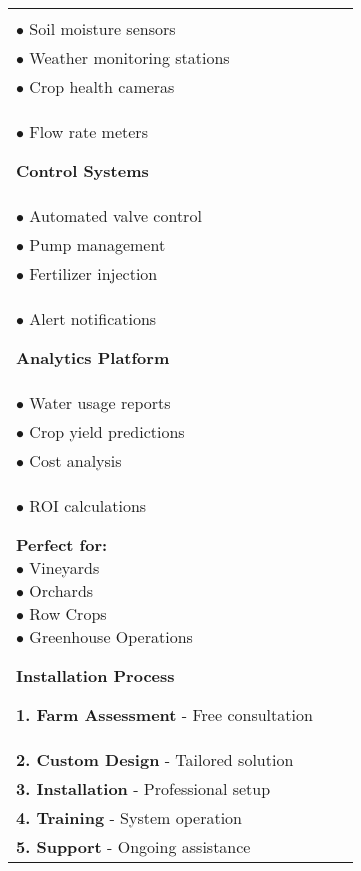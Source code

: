 \documentclass[a4paper,landscape]{article}
\begin{document}
\begin{tabular}{|p{8.5cm}|p{8.5cm}|p{8.5cm}|}
\begin{minipage}[t]{8cm}
{\large \textcolor{wetgreen}{\textbf{Sensor Network}}}\\
\small
$\bullet$ Soil moisture sensors\\
$\bullet$ Weather monitoring stations\\
$\bullet$ Crop health cameras\\
$\bullet$ Flow rate meters

\vspace{0.4cm}

{\large \textcolor{wetgreen}{\textbf{Control Systems}}}\\
\small
$\bullet$ Automated valve control\\
$\bullet$ Pump management\\
$\bullet$ Fertilizer injection\\
$\bullet$ Alert notifications

\vspace{0.4cm}

{\large \textcolor{wetgreen}{\textbf{Analytics Platform}}}\\
\small
$\bullet$ Water usage reports\\
$\bullet$ Crop yield predictions\\
$\bullet$ Cost analysis\\
$\bullet$ ROI calculations

\vspace{0.5cm}

\colorbox{wetlightgreen}{\parbox{7cm}{
\centering
\textcolor{wetblue}{\textbf{Perfect for:}}\\[0.2cm]
\textcolor{wetgreen}{$\bullet$ Vineyards}\\
\textcolor{wetgreen}{$\bullet$ Orchards}\\
\textcolor{wetgreen}{$\bullet$ Row Crops}\\
\textcolor{wetgreen}{$\bullet$ Greenhouse Operations}
}}

\vspace{0.5cm}

{\Large \textcolor{wetblue}{\textbf{Installation Process}}}

\vspace{0.3cm}

\small
\textcolor{wetblue}{\textbf{1. Farm Assessment}} - Free consultation\\
\textcolor{wetgreen}{\textbf{2. Custom Design}} - Tailored solution\\
\textcolor{wetblue}{\textbf{3. Installation}} - Professional setup\\
\textcolor{wetgreen}{\textbf{4. Training}} - System operation\\
\textcolor{wetblue}{\textbf{5. Support}} - Ongoing assistance


\end{minipage}
\end{tabular}
\end{document}
